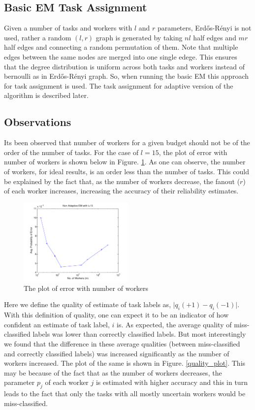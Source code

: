 \documentclass[10pt]{article}
\begin{document}
\subsection{Basic EM Task Assignment} \label{task-assign}
Given a number of tasks and workers with $l$ and $r$ parameters, Erd\H{o}s-R\'enyi is not used, rather a random $(l, r)$ graph is generated by taking $nl$ half edges and $mr$ half edges and connecting a random permutation of them. Note that multiple edges between the same nodes are merged into one single edege. This ensures that the degree distribution is uniform  across both tasks and workers instead of bernoulli as in Erd\H{o}s-R\'enyi graph. So, when running the basic EM this approach for task assignment is used. The task assignment for adaptive version of the algorithm is described later.

\subsection{Observations}
Its been observed that number of workers for a given budget should not be of the order of the number of tasks. For the case of $l= 15$, the plot of error with number of workers is shown below in Figure. \ref{error_num_workers}. As one can observe, the number of workers, for ideal results, is an order less than the number of tasks. This could be explained by the fact that, as the number of workers decrease, the fanout ($r$) of each worker increases, increasing the accuracy of their reliability estimates.

			
\begin{figure}[h!]
	\centering
	\includegraphics[width=0.5\textwidth]{worker_error.pdf}
	\caption{The plot of error with number of workers}
	\label{error_num_workers}
\end{figure}

Here we define the quality of estimate of task labels as, $\vert q_i(+1) - q_i(-1) \vert$. With this definition of quality, one can expect it to be an indicator of how confident an estimate of task label, $i$ is. As expected, the average quality of miss-classified labels was lower than correctly classified labels. But most interestingly we found that the difference in these average qualities (between miss-classified and correctly classified labels) was increased significantly as the number of workers increased. The plot of the same is shown in Figure. \ref{quality_plot}. This may be because of the fact that as the number of workers decreases, the parameter $p_j$ of each worker $j$ is estimated with higher accuracy and this in turn leads to the fact that only the tasks with all mostly uncertain workers would be miss-classified.
			
\end{document}
